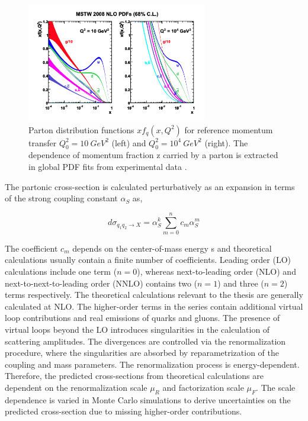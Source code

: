 \begin{figure}
\centering
    \includegraphics[width=0.7\textwidth] {figures/Theory/PDF.pdf}\hspace{1cm}
    \caption{ Parton distribution functions $xf_{q}(x,Q^2)$ for reference momentum transfer $Q^2_{0} = 10 ~ GeV^2$ (left) and $Q^2_{0} = 10^4~ GeV^{2}$ (right). The dependence of momentum fraction z carried by a parton is extracted in global PDF fits from experimental data \cite{PDFCalLHC}.}
\label{fig:PDFFig}
\end{figure}

The partonic cross-section is calculated perturbatively as an expansion in terms of the strong coupling constant $\alpha_{S}$ as,

\begin{equation}
\label{eqn:PartonicXS}
d\sigma_{q_{1}q_{2}\rightarrow X} = \alpha_{S}^{k} \sum_{m=0}^{n} c_{m}\alpha_{S}^{m}
\end{equation}

The coefficient $c_{m}$ depends on the center-of-mass energy s and theoretical calculations usually contain a finite number of coefficients. Leading order (LO) calculations include one term ($n=0$), whereas next-to-leading order (NLO) and next-to-next-to-leading order (NNLO) contains two ($n=1$) and three ($n=2$) terms respectively. The theoretical calculations relevant to the thesis are generally calculated at NLO. The higher-order terms in the series contain additional virtual loop contributions and real emissions of quarks and gluons. The presence of virtual loops beyond the LO introduces singularities in the calculation of scattering amplitudes. The divergences are controlled via the renormalization procedure, where the singularities are absorbed by reparametrization of the coupling and mass parameters. The renormalization process is energy-dependent. Therefore, the predicted cross-sections from theoretical calculations are dependent on the renormalization scale $\mu_{R}$ and factorization scale $\mu_{F}$. The scale dependence is varied in Monte Carlo simulations to derive uncertainties on the predicted cross-section due to missing higher-order contributions. 

